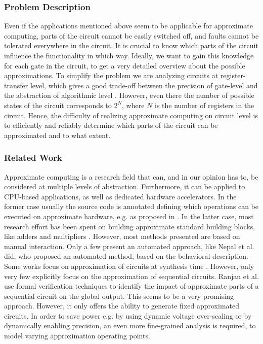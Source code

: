 \documentclass[conference]{IEEEtran}
\begin{document}
\subsubsection*{Problem Description}
Even if the applications mentioned above seem to be applicable for approximate computing, parts of the circuit cannot be easily switched off, and faults cannot be tolerated everywhere in the circuit. It is crucial to know which parts of the circuit influence the functionality in which way. Ideally, we want to gain this knowledge for each gate in the circuit, to get a very detailed overview about the possible approximations. To simplify the problem we are analyzing circuits at register-transfer level, which gives a good trade-off between the precision of gate-level and the abstraction of algorithmic level \cite{herkersdorf2014resilience}. However, even there the number of possible states of the circuit corresponds to $2^N$, where $N$ is the number of registers in the circuit. Hence, the difficulty of realizing approximate computing on circuit level is to efficiently and reliably determine which parts of the circuit can be approximated and to what extent.
\subsubsection*{Related Work}
Approximate computing is a research field that can, and in our opinion has to, be considered at multiple levels of abstraction. Furthermore, it can be applied to CPU-based applications, as well as dedicated hardware accelerators. In the former case usually the source code is annotated defining which operations can be executed on approximate hardware, e.g. as proposed in \cite{sampson_enerj:_2011}. In the latter case, most research effort has been spent on building approximate standard building blocks, like adders and multipliers \cite{huang_exploring_2011,chakrapani_highly_2008,gupta_impact:_2011,kahng_accuracy-configurable_2012}. However, most methods presented are based on manual interaction. Only a few present an automated approach, like Nepal et al. \cite{nepal_abacus:_2014} did, who proposed an automated method, based on the behavioral description. Some works focus on approximation of circuits at synthesis time \cite{miao_approximate_2013,shin_approximate_2010,choudhury_approximate_2008}. However, only very few explicitly focus on the approximation of sequential circuits. Ranjan et al. \cite{ranjan_aslan:_2014} use formal verification techniques to identify the impact of approximate parts of a sequential circuit on the global output. This seems to be a very promising approach. However, it only offers the ability to generate fixed approximated circuits. In order to save power e.g. by using dynamic voltage over-scaling or by dynamically enabling precision, an even more fine-grained analysis is required, to model varying approximation operating points.
\end{document}
